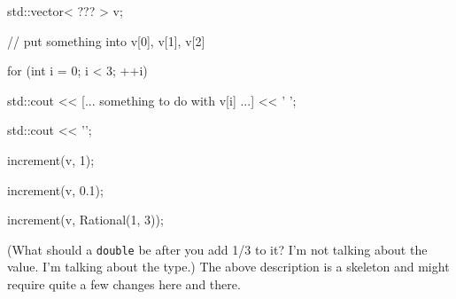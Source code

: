 \begin{console}

std::vector< ??? > v;

// put something into v[0], v[1], v[2]

for (int i = 0; i < 3; ++i)

{   

    std::cout << [... something to do with v[i] ...] << ' ';

}

std::cout << '\n';

increment(v, 1);

increment(v, 0.1);

increment(v, Rational(1, 3));

\end{console}



(What should a \verb!double! be after you add 1/3 to it? I'm not talking about the value. I'm talking about the type.) The above description is a skeleton and might require quite a few changes here and there.

